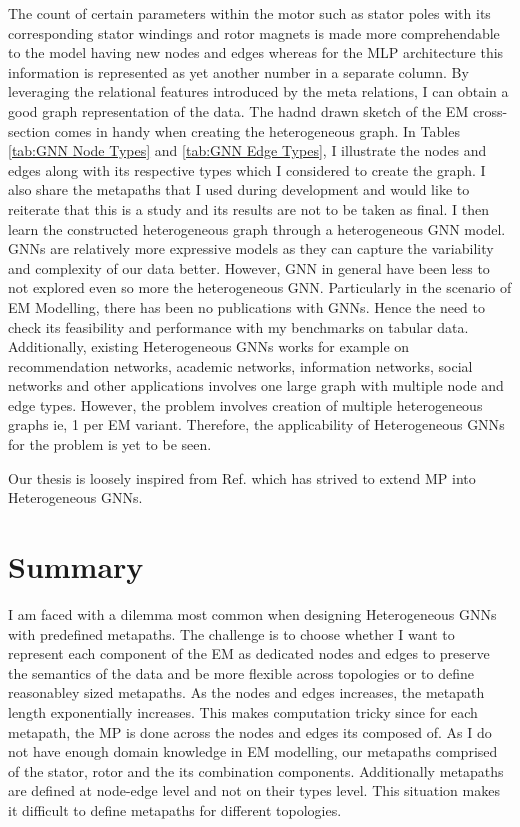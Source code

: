 \documentclass{report} %
\begin{document}
The count of certain parameters within the motor such as stator poles with its corresponding stator windings and rotor magnets is made more comprehendable to the 
model having new nodes and edges whereas for the \ac{MLP} architecture this information is represented as yet another number in a separate column. 
By leveraging the relational features introduced by the meta relations, I can obtain a good graph representation of the data.
The hadnd drawn sketch of the \ac{EM} cross-section comes in handy when creating the heterogeneous graph. In Tables \ref{tab:GNN Node Types} and \ref{tab:GNN Edge Types}, 
I illustrate the nodes and edges along with its respective types which I considered to create the graph. I also share the metapaths that I used during development and 
would like to reiterate that this is a study and its results are not to be taken as final.
I then learn the constructed heterogeneous graph through a heterogeneous \ac{GNN} model.  \\

\ac{GNN}s are relatively more expressive models as they can capture the variability and complexity of our data better.
However, \ac{GNN} in general have been less to not explored even so more the heterogeneous \ac{GNN}.
Particularly in the scenario of \ac{EM} Modelling, there has been no publications with \ac{GNN}s.
Hence the need to check its feasibility and performance with my benchmarks on tabular data.
Additionally, existing Heterogeneous \ac{GNN}s works for example on recommendation networks, academic networks, information networks, social networks and other applications 
involves one large graph with multiple node and edge types. 
However, the problem involves creation of multiple heterogeneous graphs ie, 1 per \ac{EM} variant. Therefore, the applicability of Heterogeneous \ac{GNN}s for the 
problem is yet to be seen.

Our thesis is loosely inspired from Ref. \cite{ML HGNN-2023} which has strived to extend \ac{MP} into Heterogeneous \ac{GNN}s.

\section{Summary}\label{sec:EM Heterogeneous GNN Discussion}
I am faced with a dilemma most common when designing Heterogeneous \ac{GNN}s with predefined metapaths.
The challenge is to choose whether I want to represent each component of the \ac{EM} as dedicated nodes and edges to preserve the semantics of the data and be more flexible 
across topologies or to define reasonabley sized metapaths. As the nodes and edges increases, the metapath length exponentially increases.
This makes computation tricky since for each metapath, the \ac{MP} is done across the nodes and edges its composed of.
As I do not have enough domain knowledge in \ac{EM} modelling, our metapaths comprised of the stator, rotor and the its combination components.
Additionally metapaths are defined at node-edge level and not on their types level. This situation makes it difficult to define metapaths for different topologies.
\end{document}
